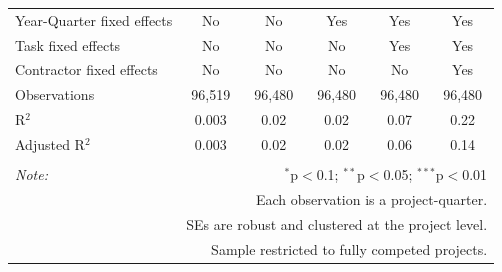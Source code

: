 \documentclass[
]{article}
\begin{document}
\begin{table}[H]
\begin{tabular}{@{\extracolsep{-2pt}}lccccc}
Year-Quarter fixed effects & No & No & Yes & Yes & Yes \\ 
Task fixed effects & No & No & No & Yes & Yes \\ 
Contractor fixed effects & No & No & No & No & Yes \\ 
Observations & 96,519 & 96,480 & 96,480 & 96,480 & 96,480 \\ 
R$^{2}$ & 0.003 & 0.02 & 0.02 & 0.07 & 0.22 \\ 
Adjusted R$^{2}$ & 0.003 & 0.02 & 0.02 & 0.06 & 0.14 \\ 
\hline 
\hline \\[-1.8ex] 
\textit{Note:}  & \multicolumn{5}{r}{$^{*}$p$<$0.1; $^{**}$p$<$0.05; $^{***}$p$<$0.01} \\ 
 & \multicolumn{5}{r}{Each observation is a project-quarter.} \\ 
 & \multicolumn{5}{r}{SEs are robust and clustered at the project level.} \\ 
 & \multicolumn{5}{r}{Sample restricted to fully competed projects.} \\ 
\end{tabular} 
\end{table}
\end{document}
